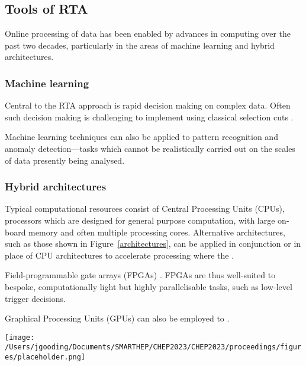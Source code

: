 \subsection{Tools of RTA}
\label{rta-tools}
Online processing of data has been enabled by advances in computing over the past two decades, particularly in the areas of machine learning and hybrid architectures.

\subsubsection{Machine learning}
\label{machine-learning}
Central to the RTA approach is rapid decision making on complex data. Often such decision making is challenging to implement using classical selection cuts  \cite{albertsson-ml}.\par
Machine learning techniques can also be applied to pattern recognition and anomaly detection—tasks which cannot be realistically carried out on the scales of data presently being analysed.

\subsubsection{Hybrid architectures}
\label{hybrid-architectures}
Typical computational resources consist of Central Processing Units (CPUs), processors which are designed for general purpose computation, with large on-board memory and often multiple processing cores. Alternative architectures, such as those shown in Figure~\ref{architectures}, can be applied in conjunction or in place of CPU architectures to accelerate processing where the . \par
Field-programmable gate arrays (FPGAs) \cite{duarte-fpgas}. FPGAs are thus well-suited to bespoke, computationally light but highly parallelisable tasks, such as low-level trigger decisions.\par
Graphical Processing Units (GPUs) can also be employed to . \cite{vomBruch-gpus}
\begin{figure*}
    \centering
    \vspace*{5cm}       %
    \texttt{[image: /Users/jgooding/Documents/SMARTHEP/CHEP2023/CHEP2023/proceedings/figures/placeholder.png]}
    \caption{Comparison of computing architectures.}
    \label{architectures}       %
\end{figure*}